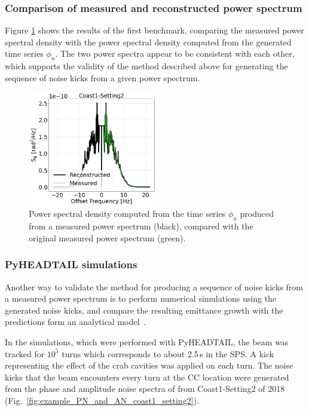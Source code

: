 \subsubsection*{Comparison of measured and reconstructed power spectrum} %
Figure \ref{fig:generate_noise_kicks_sanity_check_1} shows the results of the first benchmark, comparing the measured power spectral density with the power spectral density computed from the generated time series $\phi_n$. The two power spectra appear to be consistent with each other, which supports the validity of the method described above for generating the sequence of noise kicks from a given power spectrum. 

\begin{figure}[!ht]
     \centering         
     \includegraphics[width=0.5\textwidth]{./images/app_B/coast1_setting2_Syy_original_vs_reconstructed_sanity_check.png}
         \caption{Power spectral density computed from the time series $\phi_n$ produced from a measured power spectrum (black), compared with the original measured power spectrum (green).}
         \label{fig:generate_noise_kicks_sanity_check_1}
\end{figure} 

\subsubsection*{PyHEADTAIL simulations} %
Another way to validate the method for producing a sequence of noise kicks from a measured power spectrum is to perform numerical simulations using the generated noise kicks, and compare the resulting emittance growth with the predictions form an analytical model~\cite{PhysRevSTAB.18.101001}.

In the simulations, which were performed with PyHEADTAIL, the beam was tracked for $10^5$ turns which corresponds to about 2.5\,s in the SPS. A kick representing the effect of the crab cavities was applied on each turn. The noise kicks that the beam encounters every turn at the CC location were generated from the phase and amplitude noise spectra of from Coast1-Setting2 of 2018 (Fig.~\ref{fig:example_PN_and_AN_coast1_setting2}). 

